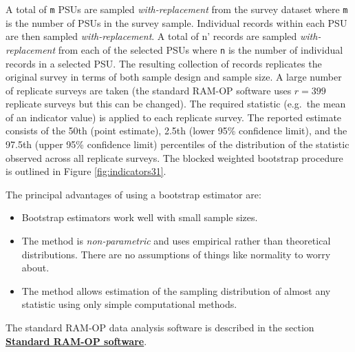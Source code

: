 \documentclass[12pt,a4paper]{book}
\providecommand{\tightlist}{%
  \setlength{\itemsep}{0pt}\setlength{\parskip}{0pt}}
\theoremstyle{definition}
\theoremstyle{definition}
\theoremstyle{definition}
\theoremstyle{remark}
\begin{document}
A total of \texttt{m\textquotesingle{}} PSUs are sampled
\emph{with-replacement} from the survey dataset where
\texttt{m\textquotesingle{}} is the number of PSUs in the survey sample.
Individual records within each PSU are then sampled
\emph{with-replacement}. A total of n' records are sampled
\emph{with-replacement} from each of the selected PSUs where
\texttt{n\textquotesingle{}} is the number of individual records in a
selected PSU. The resulting collection of records replicates the
original survey in terms of both sample design and sample size. A large
number of replicate surveys are taken (the standard RAM-OP software uses
\(r = 399\) replicate surveys but this can be changed). The required
statistic (e.g.~the mean of an indicator value) is applied to each
replicate survey. The reported estimate consists of the 50th (point
estimate), 2.5th (lower 95\% confidence limit), and the 97.5th (upper
95\% confidence limit) percentiles of the distribution of the statistic
observed across all replicate surveys. The blocked weighted bootstrap
procedure is outlined in Figure \ref{fig:indicators31}.

The principal advantages of using a bootstrap estimator are:

\begin{itemize}
\tightlist
\item
  Bootstrap estimators work well with small sample sizes.
\item
  The method is \emph{non-parametric} and uses empirical rather than
  theoretical distributions. There are no assumptions of things like
  normality to worry about.
\item
  The method allows estimation of the sampling distribution of almost
  any statistic using only simple computational methods.
\end{itemize}

The standard RAM-OP data analysis software is described in the section
\protect\hyperlink{software}{\textbf{Standard RAM-OP software}}.

\newpage
\end{document}
